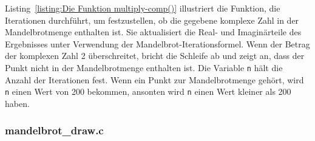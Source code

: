 \documentclass[ngerman,12pt,a4paper,titlepage]{article}
\begin{document}
\begin{sloppypar}
Listing~\ref{listing:Die Funktion multiply-comp()} illustriert die Funktion, die Iterationen durchführt, um festzustellen, ob die gegebene komplexe Zahl in der Mandelbrotmenge enthalten ist. Sie aktualisiert die Real- und Imaginärteile des Ergebnisses unter Verwendung der Mandelbrot-Iterationsformel. Wenn der Betrag der komplexen Zahl 2 überschreitet, bricht die Schleife ab und zeigt an, dass der Punkt nicht in der Mandelbrotmenge enthalten ist. Die Variable \texttt{n} hält die Anzahl der Iterationen fest. Wenn ein Punkt zur Mandelbrotmenge gehört, wird \texttt{n} einen Wert von 200 bekommen, ansonten wird \texttt{n} einen Wert kleiner als 200 haben.


\end{sloppypar}

\subsubsection{mandelbrot\_draw.c}
\end{document}

